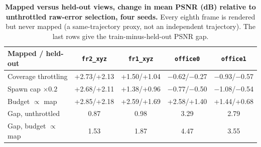 \begin{table}[tbp]
\centering
\footnotesize\setlength{\tabcolsep}{1pt}
\begin{tabular}{lcccc}
\toprule
\textbf{Mapped / held-out} & \texttt{fr2\_xyz} & \texttt{fr1\_xyz} & \texttt{office0} & \texttt{office1} \\
\midrule
Coverage throttling & +2.73/+2.13 & +1.50/+1.04 & $-$0.62/$-$0.27 & $-$0.93/$-$0.57 \\
Spawn cap $\times0.2$ & +2.68/+2.11 & +1.38/+0.96 & $-$0.77/$-$0.50 & $-$1.08/$-$0.54 \\
Budget $\propto$ map & +2.85/+2.18 & +2.59/+1.69 & +2.58/+1.40 & +1.44/+0.68 \\
\midrule
Gap, unthrottled & 0.87 & 0.98 & 3.29 & 2.79 \\
Gap, budget $\propto$ map & 1.53 & 1.87 & 4.47 & 3.55 \\
\bottomrule
\end{tabular}
\caption{\textbf{Mapped versus held-out views, change in mean PSNR (dB) relative to unthrottled raw-error selection, four seeds.} Every eighth frame is rendered but never mapped (a same-trajectory proxy, not an independent trajectory). The last rows give the train-minus-held-out PSNR gap.}
\label{tab:holdout}
\end{table}
